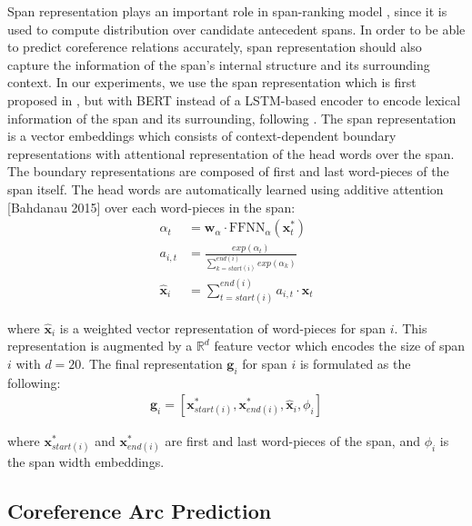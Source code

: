 \documentclass[11pt]{article}
\begin{document}
Span representation plays an important role in span-ranking model \parencite{lee2017end}, since it is used to compute distribution over candidate antecedent spans. In order to be able to predict coreference relations accurately, span representation should also capture the information of the span's internal structure and its surrounding context. In our experiments, we use the span representation which is first proposed in \parencite{lee2017end}, but with BERT \parencite{devlin2019bert} instead of a LSTM-based encoder to encode lexical information of the span and its surrounding, following \parencite{joshi2019coref}. The span representation is a vector embeddings which consists of context-dependent boundary representations with attentional representation of the head words over the span. The boundary representations are composed of first and last word-pieces of the span itself. The head words are automatically learned using additive attention [Bahdanau 2015] over each word-pieces in the span:
\begin{align*}
\alpha_{t} &= \pmb{w}_{\alpha} \cdot \text{FFNN}_{\alpha}(\pmb{x}_{t}^{*}) \\ 
a_{i,t} &=  \frac{exp(\alpha_{t})}{\sum\limits_{k=start(i)}^{end(i)} exp(\alpha_{k})} \\ 
\hat{\pmb{x}}_{i} &= \sum\limits_{t=start(i)}^{end(i)} a_{i,t} \cdot \pmb{x}_{t}
\end{align*}

where $\hat{\pmb{x}}_{i}$ is a weighted vector representation of word-pieces for span $i$. This representation is augmented by a $\mathbb{R}^{d}$ feature vector which encodes the size of span $i$ with $d = 20$. The final representation $\pmb{g}_{i}$ for span $i$ is formulated as the following:
\begin{align*}
\pmb{g}_{i} = [\pmb{x}_{start(i)}^{*}, \pmb{x}_{end(i)}^{*}, \hat{\pmb{x}}_{i}, \phi_{i}]
\end{align*}  

where $\pmb{x}_{start(i)}^{*}$ and $\pmb{x}_{end(i)}^{*}$ are first and last word-pieces of the span, and $\phi_{i}$ is the span width embeddings.

\subsection{Coreference Arc Prediction}
\label{subsection:corefarc}
\end{document}
